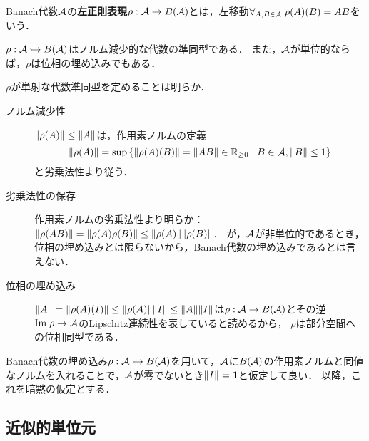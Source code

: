 \documentclass[uplatex,dvipdfmx]{jsreport}
\begin{document}
\begin{definition}
    Banach代数$\mathcal{A}$の\textbf{左正則表現}$\rho:\mathcal{A}\to B(\mathcal{A})$とは，左移動$\forall_{A,B\in\mathcal{A}}\;\rho(A)(B)=AB$をいう．
\end{definition}
\begin{lemma}
    $\rho:\mathcal{A}\hookrightarrow B(\mathcal{A})$はノルム減少的な代数の準同型である．
    また，$\mathcal{A}$が単位的ならば，$\rho$は位相の埋め込みでもある．
\end{lemma}
\begin{Proof}
    $\rho$が単射な代数準同型を定めることは明らか．
    \begin{description}
        \item[ノルム減少性] $\|\rho(A)\|\le\|A\|$は，作用素ノルムの定義
        \[\|\rho(A)\|=\sup\left\{\|\rho(A)(B)\|=\|AB\|\in\mathbb{R}_{\ge0}\mid B\in\mathcal{A},\|B\|\le 1\right\}\]
        と劣乗法性より従う．
        \item[劣乗法性の保存] 作用素ノルムの劣乗法性より明らか：$\|\rho(AB)\|=\|\rho(A)\rho(B)\|\le\|\rho(A)\|\|\rho(B)\|$．
        が，$\mathcal{A}$が非単位的であるとき，位相の埋め込みとは限らないから，Banach代数の埋め込みであるとは言えない．
        \item[位相の埋め込み] 
        $\|A\|=\|\rho(A)(I)\|\le\|\rho(A)\|\|I\|\le\|A\|\|I\|$は$\rho:\mathcal{A}\to B(\mathcal{A})$とその逆$\mathrm{Im}\;\rho\to\mathcal{A}$のLipschitz連続性を表していると読めるから，
        $\rho$は部分空間への位相同型である．
    \end{description}
\end{Proof}
\begin{remark}
    Banach代数の埋め込み$\rho:\mathcal{A}\hookrightarrow B(\mathcal{A})$を用いて，$\mathcal{A}$に$B(\mathcal{A})$の作用素ノルムと同値なノルムを入れることで，$\mathcal{A}$が零でないとき$\|I\|=1$と仮定して良い．
    以降，これを暗黙の仮定とする．
\end{remark}

\subsection{近似的単位元}
\end{document}
